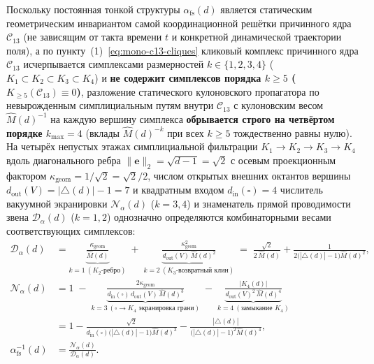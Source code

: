 \begin{theorem}
\begin{enumerate}[label=\textbf{(\arabic*)},leftmargin=*]
  Поскольку постоянная тонкой структуры $\alpha_{\mathrm{fs}}(d)$ является статическим геометрическим инвариантом самой координационной решётки причинного ядра $\mathcal{C}_{13}$ (не зависящим от такта времени $t$ и конкретной динамической траектории поля), а по пункту~(1)~\eqref{eq:mono-c13-cliques} кликовый комплекс причинного ядра $\mathcal{C}_{13}$ исчерпывается симплексами размерностей $k \in \{1, 2, 3, 4\}$ ($K_1 \subset K_2 \subset K_3 \subset K_4$) и \textbf{не содержит симплексов порядка $k \ge 5$ ($K_{\ge 5}(\mathcal{C}_{13}) \equiv 0$)}, разложение статического кулоновского пропагатора по невырожденным симплициальным путям внутри $\mathcal{C}_{13}$ с кулоновским весом $\widehat{M}(d)^{-1}$ на каждую вершину симплекса \textbf{обрывается строго на четвёртом порядке $k_{\max} = 4$} (вклады $\widehat{M}(d)^{-k}$ при всех $k \ge 5$ тождественно равны нулю). На четырёх непустых этажах симплициальной фильтрации $K_1 \to K_2 \to K_3 \to K_4$ вдоль диагонального ребра $\|\mathbf{e}\|_2 = \sqrt{d-1} = \sqrt{2}$ с осевым проекционным фактором $\kappa_{\mathrm{geom}} = 1/\sqrt{2} = \sqrt{2}/2$, числом открытых внешних октантов вершины $d_{\mathrm{out}}(V) = |{\triangle}(d)| - 1 = 7$ и квадратным входом $d_{\mathrm{in}}(\square) = 4$ числитель вакуумной экранировки $\mathcal{N}_\alpha(d)$ ($k = 3, 4$) и знаменатель прямой проводимости звена $\mathcal{D}_\alpha(d)$ ($k = 1, 2$) однозначно определяются комбинаторными весами соответствующих симплексов:
  \begin{align}
    \mathcal{D}_\alpha(d) &= \underbrace{\frac{\kappa_{\mathrm{geom}}}{\widehat{M}(d)}}_{k=1\ (K_2\text{-ребро})} \;+\; \underbrace{\frac{\kappa_{\mathrm{geom}}^2}{d_{\mathrm{out}}(V)\,\widehat{M}(d)^2}}_{k=2\ (K_3\text{-возвратный клин})} \;=\; \frac{\sqrt{2}}{2\,\widehat{M}(d)} + \frac{1}{2\bigl(|{\triangle}(d)|-1\bigr)\widehat{M}(d)^2}, \label{eq:mono-alpha-4loop-den} \\
    \mathcal{N}_\alpha(d) &= 1 \;-\; \underbrace{\frac{2\kappa_{\mathrm{geom}}}{d_{\mathrm{in}}(\square)\,d_{\mathrm{out}}(V)\,\widehat{M}(d)^3}}_{k=3\ (\square\to K_4\text{ экранировка грани})} \;-\; \underbrace{\frac{|K_4(d)|}{d_{\mathrm{out}}(V)^2\,\widehat{M}(d)^4}}_{k=4\ (\text{замыкание }K_4)} \nonumber \\
    &= 1 - \frac{\sqrt{2}}{d_{\mathrm{in}}(\square)\bigl(|{\triangle}(d)|-1\bigr)\widehat{M}(d)^3} - \frac{|{\triangle}(d)|}{\bigl(|{\triangle}(d)|-1\bigr)^2\widehat{M}(d)^4}, \label{eq:mono-alpha-4loop-num} \\
    \alpha_{\mathrm{fs}}^{-1}(d) &= \frac{\mathcal{N}_\alpha(d)}{\mathcal{D}_\alpha(d)}. \label{eq:mono-alpha-4loop-fraction}

\end{align}
\end{enumerate}
\end{theorem}

